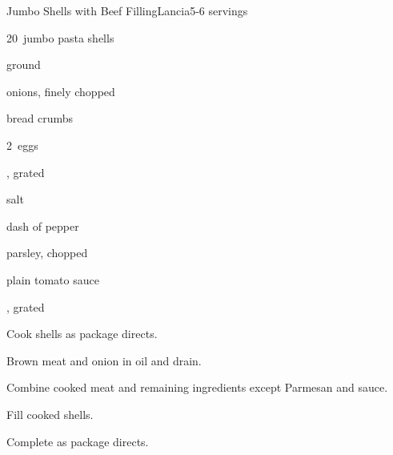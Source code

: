 \begin{recipe}{Jumbo Shells with Beef Filling\FIXME}{Lancia}{5-6 servings}

\begin{ingredients}
\item 20~jumbo pasta shells
\item {} ground 
\item \C{\quarter} onions, finely chopped
\item \C{\quarter} bread crumbs
\item 2~eggs
\item {} , grated 
\item \tp{\half} salt
\item dash of pepper
\item {} parsley, chopped
\item \C{3\half} plain tomato sauce
\item \C{\quarter} , grated
\end{ingredients}

\begin{directions}
\item Cook shells as package directs.
\item Brown meat and onion in oil and drain.
\item Combine cooked meat and remaining ingredients except Parmesan and sauce.
\item Fill cooked shells.
\item Complete as package directs.
\end{directions}

\end{recipe}
